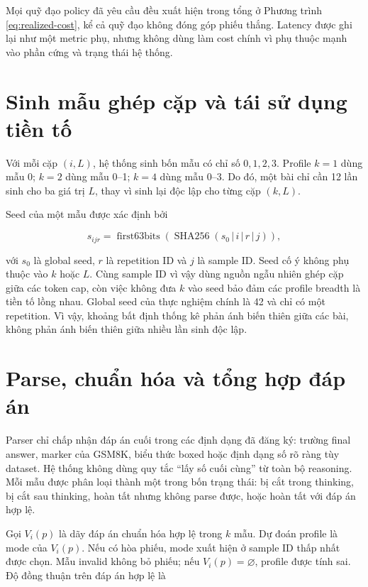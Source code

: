 Mọi quỹ đạo policy đã yêu cầu đều xuất hiện trong tổng ở Phương trình
\ref{eq:realized-cost}, kể cả quỹ đạo không đóng góp phiếu thắng. Latency được ghi lại
như một metric phụ, nhưng không dùng làm cost chính vì phụ thuộc mạnh vào phần cứng và
trạng thái hệ thống.

\section{Sinh mẫu ghép cặp và tái sử dụng tiền tố}

Với mỗi cặp $(i,L)$, hệ thống sinh bốn mẫu có chỉ số $0,1,2,3$. Profile $k=1$ dùng mẫu
0; $k=2$ dùng mẫu 0--1; $k=4$ dùng mẫu 0--3. Do đó, một bài chỉ cần 12 lần sinh cho ba
giá trị $L$, thay vì sinh lại độc lập cho từng cặp $(k,L)$.

Seed của một mẫu được xác định bởi

\begin{equation}
  s_{ijr}=\operatorname{first63bits}\!\left(
  \operatorname{SHA256}(s_0\,|\,i\,|\,r\,|\,j)\right),
\end{equation}

với $s_0$ là global seed, $r$ là repetition ID và $j$ là sample ID. Seed cố ý không
phụ thuộc vào $k$ hoặc $L$. Cùng sample ID vì vậy dùng nguồn ngẫu nhiên ghép cặp giữa
các token cap, còn việc không đưa $k$ vào seed bảo đảm các profile breadth là tiền tố
lồng nhau. Global seed của thực nghiệm chính là 42 và chỉ có một repetition. Vì vậy,
khoảng bất định thống kê phản ánh biến thiên giữa các bài, không phản ánh biến thiên
giữa nhiều lần sinh độc lập.

\section{Parse, chuẩn hóa và tổng hợp đáp án}

Parser chỉ chấp nhận đáp án cuối trong các định dạng đã đăng ký: trường final answer,
marker của GSM8K, biểu thức boxed hoặc định dạng số rõ ràng tùy dataset. Hệ thống không
dùng quy tắc ``lấy số cuối cùng'' từ toàn bộ reasoning. Mỗi mẫu được phân loại thành
một trong bốn trạng thái: bị cắt trong thinking, bị cắt sau thinking, hoàn tất nhưng
không parse được, hoặc hoàn tất với đáp án hợp lệ.

Gọi $V_i(p)$ là dãy đáp án chuẩn hóa hợp lệ trong $k$ mẫu. Dự đoán profile là mode của
$V_i(p)$. Nếu có hòa phiếu, mode xuất hiện ở sample ID thấp nhất được chọn. Mẫu invalid
không bỏ phiếu; nếu $V_i(p)=\varnothing$, profile được tính sai. Độ đồng thuận trên đáp
án hợp lệ là

